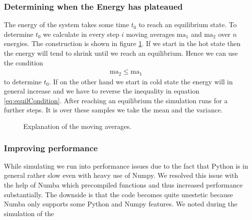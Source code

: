 \subsubsection{Determining when the Energy has plateaued}

The energy of the system takes some time $t_0$ to reach an equilibrium state. To determine $t_0$ we calculate in every step $i$ moving averages $\text{ma}_1$ and $\text{ma}_2$ over $n$ energies. The construction is shown in figure \ref{fi:movingAverages}. If we start in the hot state then the energy will tend to shrink until we reach an equilibrium. Hence we can use the condition
\begin{align}
	\text{ma}_2 \leq \text{ma}_1 \label{eq:equilCondition}
\end{align}
to determine $t_0$. If on the other hand we start in cold state the energy will in general increase and we have to reverse the inequality in equation \eqref{eq:equilCondition}. After reaching an equilibrium the simulation runs for a further  steps. It is over these samples we take the mean and the variance.

\begin{figure}
\centering

\caption{Explanation of the moving averages.}
\label{fi:movingAverages}
\end{figure}

\subsubsection{Improving performance}
While simulating we run into performance issues due to the fact that Python is in general rather slow even with heavy use of Numpy. We resolved this issue with the help of Numba which precompiled functions and thus increased performance substantially. The downside is that the code becomes quite unestetic because Numba only supports some Python and Numpy features. We noted during the simulation of the 


\begin{figure}
\centering

\end{figure}

\begin{figure}
\centering

\end{figure}

\begin{figure}
\centering

\end{figure}

